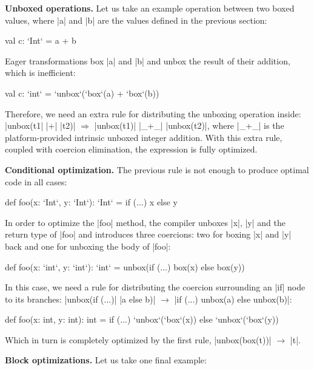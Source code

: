 \textbf{Unboxed operations.} Let us take an example operation between two boxed values, where |a| and |b| are the values defined in the previous section:

\begin{lstlisting-nobreak}
 val c: `Int` = a + b
\end{lstlisting-nobreak}

Eager transformations box |a| and |b| and unbox the result of their addition, which is inefficient:

\begin{lstlisting-nobreak}
 val c: `int` = `unbox`(`box`(a) + `box`(b))
\end{lstlisting-nobreak}

Therefore, we need an extra rule for distributing the unboxing operation inside: |unbox(t1| |+| |t2)| $\Rightarrow$ |unbox(t1)| |_+_| |unbox(t2)|, where |_+_| is the platform-provided intrinsic unboxed integer addition. With this extra rule, coupled with coercion elimination, the expression is fully  optimized.

\textbf{Conditional optimization.} The previous rule is not enough to produce optimal code in all cases:

\begin{lstlisting-nobreak}
 def foo(x: `Int`, y: `Int`): `Int` =
   if (...) x else y
\end{lstlisting-nobreak}

In order to optimize the |foo| method, the compiler unboxes |x|, |y| and the return type of |foo| and introduces three coercions: two for boxing |x| and |y| back and one for unboxing the body of |foo|:

\begin{lstlisting-nobreak}
 def foo(x: `int`, y: `int`): `int` =
   unbox(if (...) box(x) else box(y))
\end{lstlisting-nobreak}

In this case, we need a rule for distributing the coercion surrounding an |if| node to its branches: |unbox(if (...)| |a else b)| $\rightarrow$ |if (...) unbox(a) else unbox(b)|:

\begin{lstlisting-nobreak}
 def foo(x: int, y: int): int =
   if (...) `unbox`(`box`(x)) else `unbox`(`box`(y))
\end{lstlisting-nobreak}

Which in turn is completely optimized by the first rule, |unbox(box(t))| $\rightarrow$ |t|.

\textbf{Block optimizations.} Let us take one final example:

